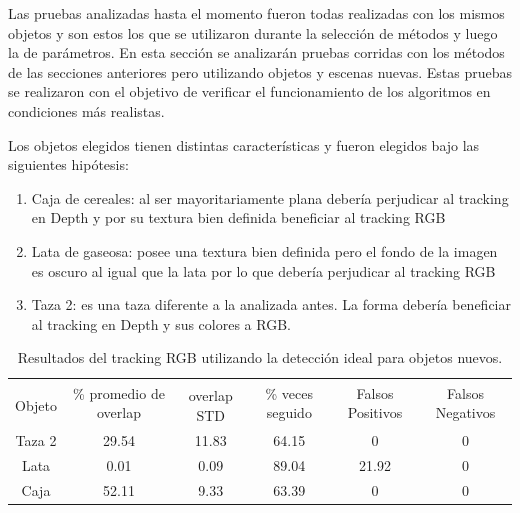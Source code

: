 Las pruebas analizadas hasta el momento fueron todas realizadas con los mismos objetos y son estos los que se utilizaron durante la selección de métodos y luego la de parámetros. En esta sección se analizarán pruebas corridas con los métodos de las secciones anteriores pero utilizando objetos y escenas nuevas. Estas pruebas se realizaron con el objetivo de verificar el funcionamiento de los algoritmos en condiciones más realistas.

Los objetos elegidos tienen distintas características y fueron elegidos bajo las siguientes hipótesis:
\begin{enumerate}
	\item Caja de cereales: al ser mayoritariamente plana debería perjudicar al tracking en Depth y por su textura bien definida beneficiar al tracking RGB
	\item Lata de gaseosa: posee una textura bien definida pero el fondo de la imagen es oscuro al igual que la lata por lo que debería perjudicar al tracking RGB
	\item Taza 2: es una taza diferente a la analizada antes. La forma debería beneficiar al tracking en Depth y sus colores a RGB.
\end{enumerate}


\begin{table}[h]
    \begin{tabular}{|c|c|c|c|c|c|}
    \hline
    & \multirow{2}{2.4cm}{\% promedio de overlap} & & \multirow{2}{2cm}{\% veces seguido} & \multirow{2}{1.6cm}{Falsos Positivos} & \multirow{2}{1.6cm}{Falsos Negativos}\\
	Objeto & & overlap STD & & &\\
    \hline
    Taza 2  & 29.54      & 11.83       & 64.15             & 0                & 0\\
    \hline
    Lata    &  0.01      &  0.09       & 89.04             & 21.92            & 0\\
    \hline
    Caja    & 52.11      &  9.33       & 63.39             & 0                & 0\\
    \hline
    \end{tabular}
\caption{Resultados del tracking RGB utilizando la detección ideal para objetos nuevos.}
\label{tabla_rgb_nuevos}
\end{table}


